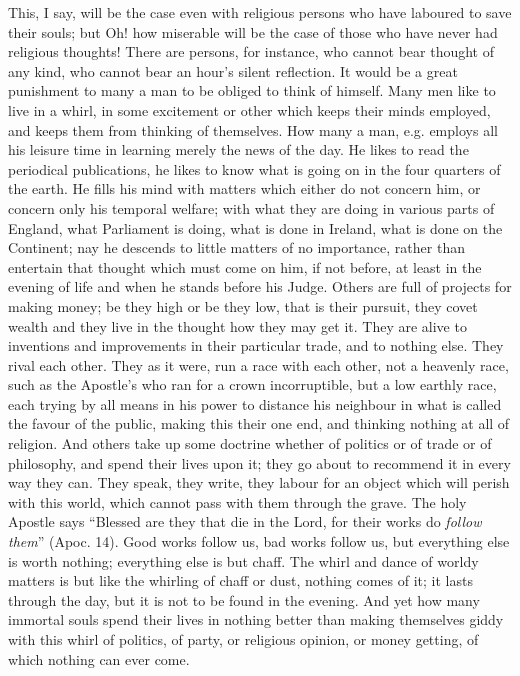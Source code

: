 This, I say, will be the case even with religious
persons who have laboured to save their souls; but Oh! how miserable
will be the case of those who have never had religious thoughts! There
are persons, for instance, who cannot bear thought of any kind, who
cannot bear an hour's silent reflection. It would be a great
punishment to many a man to be obliged to think of himself. Many men
like to live in a whirl, in some excitement or other which keeps their
minds employed, and keeps them from thinking of themselves. How many a
man, e.g. employs all his leisure time in learning merely the news of
the day. He likes to read the periodical publications, he likes to
know what is going on in the four quarters of the earth. He fills
his mind with matters which either do not concern him, or concern only
his temporal welfare; with what they are doing in various parts of
England, what Parliament is doing, what is done in Ireland, what is
done on the Continent; nay he descends to little matters of no
importance, rather than entertain that thought which must come on him,
if not before, at least in the evening of life and when he stands
before his Judge. Others are full of projects for making money; be
they high or be they low, that is their pursuit, they covet wealth and
they live in the thought how they may get it. They are alive to
inventions and improvements in their particular trade, and to nothing
else. They rival each other. They as it were, run a race with each
other, not a heavenly race, such as the Apostle's who ran for a crown
incorruptible, but a low earthly race, each trying by all means in his
power to distance his neighbour in what is called the favour of the
public, making this their one end, and thinking nothing at all of
religion. And others take up some doctrine whether of politics or of
trade or of philosophy, and spend their lives upon it; they go about
to recommend it in every way they can. They speak, they write, they
labour for an object which will perish with this world, which cannot
pass with them through the grave. The holy Apostle says ``Blessed are
they that die in the Lord, for their works do \emph{follow them}'' (Apoc. 14). Good works follow us, bad works follow us, but everything
else is worth nothing; everything else is but chaff. The whirl and
dance of worldy matters is but like the whirling of chaff or dust,
nothing comes of it; it lasts through the day, but it is not to be
found in the evening. And yet how many immortal souls spend their
lives in nothing better than making themselves giddy with this whirl
of politics, of party, or religious opinion, or money getting, of
which nothing can ever come.

